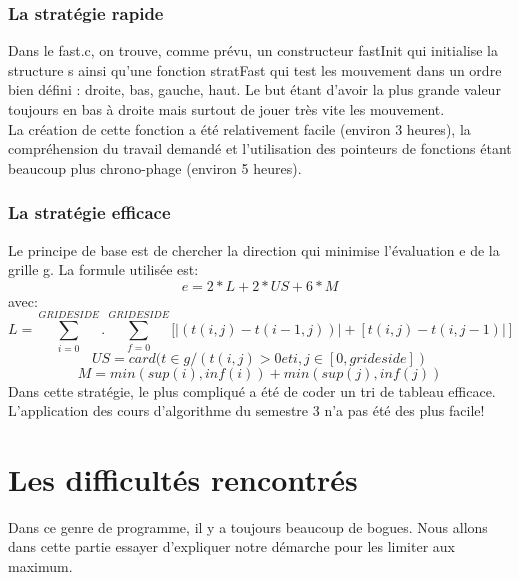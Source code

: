 \documentclass{report}
\begin{document}
\subsection{La stratégie rapide}
Dans le fast.c, on trouve, comme prévu, un constructeur fastInit qui initialise la structure s ainsi qu'une fonction stratFast qui test les mouvement dans un ordre bien défini : droite, bas, gauche, haut. Le but étant d'avoir la plus grande valeur toujours en bas à droite mais surtout de jouer très vite les mouvement.\\
La création de cette fonction a été relativement facile (environ 3 heures), la compréhension du travail demandé et l'utilisation des pointeurs de fonctions étant beaucoup plus chrono-phage (environ 5 heures).
\subsection{La stratégie efficace}
Le principe de base est de chercher la direction qui minimise l'évaluation e de la grille g. La formule utilisée est:
$$e=2*L+2*US+6*M$$ avec:
$$L=\sum_{i=0}^{GRIDESIDE} .^{ } \sum_{f=0}^{GRIDESIDE}[|(t(i,j)-t(i-1,j))|+[t(i,j)-t(i,j-1)|]$$
$$US=card(t \in g / (t(i,j)>0 et i,j \in [0,grideside]) $$
$$M=min(sup(i),inf(i)) + min(sup(j),inf(j))$$
Dans cette stratégie, le plus compliqué a été de coder un tri de tableau efficace. L'application des cours d'algorithme du semestre 3 n'a pas été des plus facile!

\chapter{Les difficultés rencontrés}
Dans ce genre de programme, il y a toujours beaucoup de bogues. Nous allons dans cette partie essayer d'expliquer notre démarche pour les limiter aux maximum.
\end{document}
